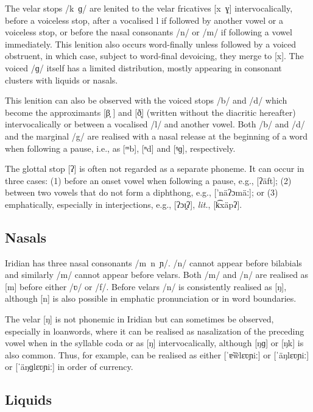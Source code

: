 The velar stops /k~ɡ/ are lenited to the velar fricatives [x~ɣ] intervocalically, before a voiceless stop, after a vocalised l if followed by another vowel or a voiceless stop, or before the nasal consonants /n/ or /m/ if following a vowel immediately. This lenition also occurs word-finally unless followed by a voiced obstruent, in which case, subject to word-final devoicing, they merge to [x]. The voiced /ɡ/ itself has a limited distribution, mostly appearing in consonant clusters with liquids or nasals.

This lenition can also be observed with the voiced stops /b/ and /d/ which become the approximants [β̞	] and [ð̞] (written without the diacritic hereafter) intervocalically or between a vocalised /l/ and another vowel. Both /b/ and /d/ and the marginal /g/ are realised with a nasal release at the beginning of a word when following a pause, i.e., as [ᵐb], [ⁿd] and [ᵑɡ], respectively.

The glottal stop [ʔ] is often not regarded as a separate phoneme.
It can occur in three cases: (1) before an onset vowel when following a pause, e.g.,  [ʔäft]; (2) between two vowels that do not form a diphthong, e.g.,  ['näʔɔmäː]; or (3) emphatically, especially in interjections, e.g.,  [ʔɔɪ̯ʔ],  \emph{lit.},  [k͡xäpʔ].


\subsection{Nasals}
Iridian has three nasal consonants /m~n~ɲ/. /n/ cannot appear before bilabials and similarly /m/ cannot appear before velars. Both /m/ and /n/ are realised as [m] before either /ʋ/ or /f/. Before velars /n/ is consistently realised as [ŋ], although [n] is also possible in emphatic pronunciation or in word boundaries.

The velar [ŋ] is not phonemic in Iridian but can sometimes be observed, especially in loanwords, where it can be realised as nasalization of the preceding vowel when in the syllable coda or as [ŋ] intervocalically, although [ŋɡ] or [ŋk] is also common. Thus, for example,  can be realised as either [ˈɐ̃w̃lɛʋɲiː] or [ˈäŋlɛʋɲiː] or [ˈäŋɡlɛʋɲiː] in order of currency.


\subsection{Liquids}


